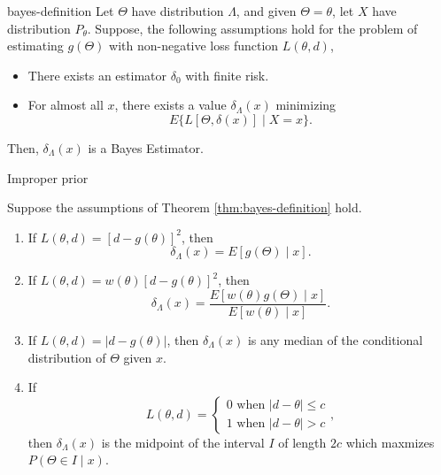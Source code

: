 \begin{theorem}{}{bayes-definition}
    Let $\Theta$ have distribution $\Lambda$, and given $\Theta=\theta$, let $X$ have distribution $P_{\theta}$. Suppose, the following assumptions hold for the problem of estimating $g\left(\Theta\right)$ with non-negative loss function $L\left(\theta,d\right)$,
    \begin{itemize}
        \item There exists an estimator $\delta_0$ with finite risk.
        \item For almost all $x$, there exists a value $\delta_{\Lambda}\left(x\right)$ minimizing
              \begin{equation}
                  E\{L[\Theta,\delta\left(x\right)] \mid X=x\}.
              \end{equation}
    \end{itemize}
    Then, $\delta_{\Lambda}\left(x\right)$ is a Bayes Estimator.
\end{theorem}
\begin{note}
    Improper prior
\end{note}

\begin{corollary}{}{}
    Suppose the assumptions of Theorem \ref{thm:bayes-definition} hold.
    \begin{enumerate}
        \item If $L\left(\theta,d\right)=[d-g\left(\theta\right)]^2$, then
              \begin{equation}
                  \delta_{\Lambda}\left(x\right)=E[g\left(\Theta\right) \mid x].
              \end{equation}
        \item If $L\left(\theta,d\right)=w\left(\theta\right)[d-g\left(\theta\right)]^2$, then
              \begin{equation}
                  \delta_{\Lambda}\left(x\right)=\frac{E[w\left(\theta\right)g\left(\Theta\right) \mid x]}{E[w\left(\theta\right) \mid x]}.
              \end{equation}
        \item If $L\left(\theta,d\right)=|d-g\left(\theta\right)|$, then $\delta_\Lambda\left(x\right)$ is any median of the conditional distribution of $\Theta$ given $x$.
        \item If
              \begin{equation*}
                  L(\theta, d)=\left\{
                  \begin{array}{l}
                      0 \text { when }|d-\theta| \leq c \\
                      1 \text { when }|d-\theta|>c
                  \end{array}
                  \right.,
              \end{equation*}
              then $\delta_\Lambda\left(x\right)$ is the midpoint of the interval $I$ of length $2c$ which maxmizes $P\left(\Theta\in I\mid x\right)$.
    \end{enumerate}
\end{corollary}

